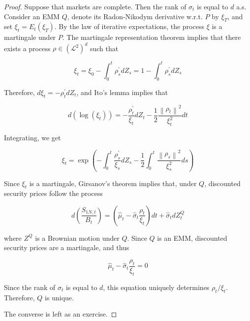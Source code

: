 \documentclass[\topdir/lecture\_notes.tex]{subfiles}
\begin{document}
\begin{proof}
Suppose that markets are complete. Then the rank of \(\sigma_{t}\) is equal to \(d\) a.s. Consider an EMM \(Q\), denote its Radon-Nikodym derivative w.r.t. \(P\) by \(\xi_{T}\), and set \(\xi_{t}=E_{t}\left(\xi_{T}\right)\). By the law of iterative expectations, the process \(\xi\) is a martingale under \(P\). The martingale representation theorem implies that there exists a process \(\rho \in\left(\mathcal{L}^{2}\right)^{d}\) such that

\begin{equation}
\xi_{t}=\xi_{0}-\int_{0}^{t} \rho_{s}^{\prime} d Z_{s}=1-\int_{0}^{t} \rho_{s}^{\prime} d Z_{s} \label{eq:6.2.5}
\end{equation}

Therefore, \(d \xi_{t}=-\rho_{t}^{\prime} d Z_{t}\), and Ito's lemma implies that

\begin{equation}
d\left(\log \left(\xi_{t}\right)\right)=-\frac{\rho_{t}^{\prime}}{\xi_{t}} d Z_{t}-\frac{1}{2} \frac{\left\|\rho_{t}\right\|^{2}}{\xi_{t}^{2}} d t
\end{equation}

Integrating, we get

\begin{equation}
\xi_{t}=\exp \left(-\int_{0}^{t} \frac{\rho_{s}^{\prime}}{\xi_{s}} d Z_{s}-\frac{1}{2} \int_{0}^{t} \frac{\left\|\rho_{s}\right\|^{2}}{\xi_{s}^{2}} d s\right)
\end{equation}

Since \(\xi_{t}\) is a martingale, Girsanov's theorem implies that, under \(Q\), discounted security prices follow the process

\begin{equation}
d\left(\frac{S_{1 N, t}}{B_{t}}\right)=\left(\hat{\mu}_{t}-\hat{\sigma}_{t} \frac{\rho_{t}}{\xi_{t}}\right) d t+\hat{\sigma}_{t} d Z_{t}^{Q}
\end{equation}

where \(Z^{Q}\) is a Brownian motion under \(Q\). Since \(Q\) is an EMM, discounted security prices are a martingale, and thus

\begin{equation}
\hat{\mu}_{t}-\hat{\sigma}_{t} \frac{\rho_{t}}{\xi_{t}}=0
\end{equation}

Since the rank of \(\sigma_{t}\) is equal to \(d\), this equation uniquely determines \(\rho_{t} / \xi_{t}\). Therefore, \(Q\) is unique.

The converse is left as an exercise.
\end{proof}
\end{document}
